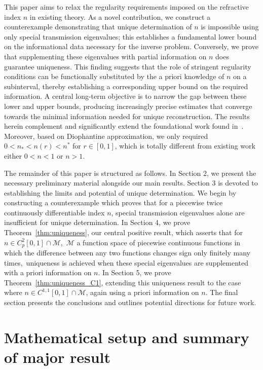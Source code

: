 \documentclass[11pt,reqno]{amsart}
\theoremstyle{definition}
\theoremstyle{remark}
\numberwithin{equation}{section}
\begin{document}
This paper aims to relax the regularity requirements imposed on the refractive index $n$ in existing theory. As a novel contribution, we construct a counterexample demonstrating that unique determination of $n$ is impossible using only special transmission eigenvalues; this establishes a fundamental lower bound on the informational data necessary for the inverse problem. Conversely, we prove that supplementing these eigenvalues with partial information on $n$ does guarantee uniqueness. This finding suggests that the role of stringent regularity conditions can be functionally substituted by the a priori knowledge of $n$ on a subinterval, thereby establishing a corresponding upper bound on the required information. A central long-term objective is to narrow the gap between these lower and upper bounds, producing increasingly precise estimates that converge towards the minimal information needed for unique reconstruction. The results herein complement and significantly extend the foundational work found in~\cite{AGP11, CL13, GP17}. Moreover, based on Diophantine approximation, we only required $0<n_*<n(r)<n^{*}$ for $r\in [0,1]$, which is totally different from existing work either $ 0<n<1$ or $n>1$.

The remainder of this paper is structured as follows. In Section 2, we present the necessary preliminary material alongside our main results. Section 3 is devoted to establishing the limits and potential of unique determination. We begin by constructing a counterexample which proves that for a piecewise twice continuously differentiable index $n$, special transmission eigenvalues alone are insufficient for unique determination.  In Section 4, we prove Theorem~\ref{thm:uniqueness}, our central positive result, which asserts that for $n \in C_p^2[0,1] \cap \mathcal{M}$,~$\mathcal{M}$ a function space of piecewise continuous functions in which the difference between any two functions changes sign only finitely many times,~uniqueness is achieved when these special eigenvalues are supplemented with a priori information on $n$. In Section 5, we prove Theorem~\ref{thm:uniqueness_C1}, extending this uniqueness result to the case where $n\in C^{1,1}[0,1] \cap \mathcal{M}$, again using a priori information on $n$. The final section presents the conclusions and outlines potential directions for future work. 


\section{Mathematical setup and summary of major result}\label{sec:major result}
\end{document}
